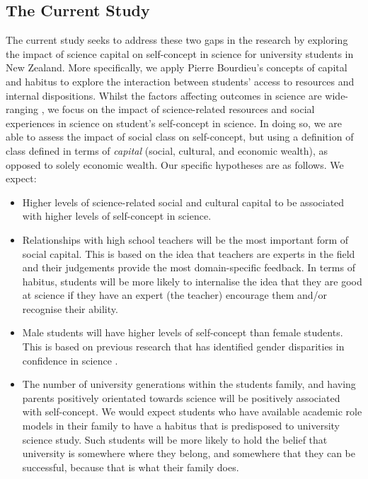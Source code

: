\subsection*{The Current Study}
\label{sec:3}

The current study seeks to address these two gaps in the research by exploring the impact of science capital on self-concept in science for university students in New Zealand. More specifically, we apply Pierre Bourdieu's \cite{Bourdieu_1986,Bourdieu1984} concepts of capital and habitus to explore the interaction between students' access to resources and internal dispositions. Whilst the factors affecting outcomes in science are wide-ranging 
\cite{osborne2003attitudes}, we focus on the impact of science-related resources and social experiences in science on student's self-concept in science. In doing so, we are able to assess the impact of social class on self-concept, but using a definition of class defined in terms of \textit{capital} (social, cultural, and economic wealth), as opposed to solely economic wealth. Our specific hypotheses are as follows. We expect:
\begin{itemize}
    \item Higher levels of science-related social and cultural capital to be associated with higher levels of self-concept in science. 
    \item Relationships with high school teachers will be the most important form of social capital. This is based on the idea that teachers are experts in the field and their judgements provide the most domain-specific feedback. In terms of habitus, students will be more likely to internalise the idea that they are good at science if they have an expert (the teacher) encourage them and/or recognise their ability. 
    \item Male students will have higher levels of self-concept than female students. This is based on previous research that has identified gender disparities in confidence in science \cite{Ellis_2016}. 
    \item The number of university generations within the students family, and having parents positively orientated towards science will be positively associated with self-concept. We would expect students who have available academic role models in their family to have a habitus that is predisposed to university science study. Such students will be more likely to  hold the belief that university is somewhere where they belong, and somewhere that they can be successful, because that is what their family does. 
\end{itemize}
